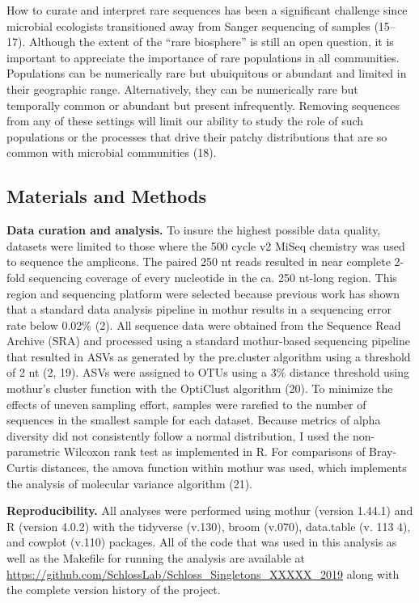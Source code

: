 \documentclass[
]{article}
\begin{document}
How to curate and interpret rare sequences has been a significant
challenge since microbial ecologists transitioned away from Sanger
sequencing of samples (15--17). Although the extent of the ``rare
biosphere'' is still an open question, it is important to appreciate the
importance of rare populations in all communities. Populations can be
numerically rare but ubuiquitous or abundant and limited in their
geographic range. Alternatively, they can be numerically rare but
temporally common or abundant but present infrequently. Removing
sequences from any of these settings will limit our ability to study the
role of such populations or the processes that drive their patchy
distributions that are so common with microbial communities (18).

\hypertarget{materials-and-methods}{%
\subsection{Materials and Methods}\label{materials-and-methods}}

\textbf{Data curation and analysis.} To insure the highest possible data
quality, datasets were limited to those where the 500 cycle v2 MiSeq
chemistry was used to sequence the amplicons. The paired 250 nt reads
resulted in near complete 2-fold sequencing coverage of every nucleotide
in the ca. 250 nt-long region. This region and sequencing platform were
selected because previous work has shown that a standard data analysis
pipeline in mothur results in a sequencing error rate below 0.02\% (2).
All sequence data were obtained from the Sequence Read Archive (SRA) and
processed using a standard mothur-based sequencing pipeline that
resulted in ASVs as generated by the pre.cluster algorithm using a
threshold of 2 nt (2, 19). ASVs were assigned to OTUs using a 3\%
distance threshold using mothur's cluster function with the OptiClust
algorithm (20). To minimize the effects of uneven sampling effort,
samples were rarefied to the number of sequences in the smallest sample
for each dataset. Because metrics of alpha diversity did not
consistently follow a normal distribution, I used the non-parametric
Wilcoxon rank test as implemented in R. For comparisons of Bray-Curtis
distances, the amova function within mothur was used, which implements
the analysis of molecular variance algorithm (21).

\textbf{Reproducibility.} All analyses were performed using mothur
(version 1.44.1) and R (version 4.0.2) with the tidyverse (v.130), broom
(v.070), data.table (v. 113 4), and cowplot (v.110) packages. All of the
code that was used in this analysis as well as the Makefile for running
the analysis are available at
\url{https://github.com/SchlossLab/Schloss_Singletons_XXXXX_2019} along
with the complete version history of the project.
\end{document}
